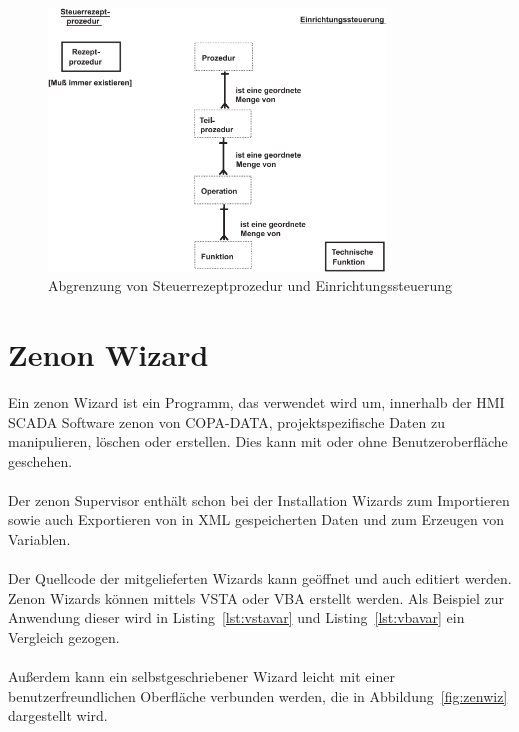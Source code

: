 \begin{figure}[h!]
		\centering
		\includegraphics[width=0.8\textwidth]{graphics/stateoftheart/steuerrezeptprozedur_einrichtungssteuerung.png}
		\caption{Abgrenzung von Steuerrezeptprozedur und Einrichtungssteuerung \cite{en61512}}
\end{figure}


\section{Zenon Wizard}
Ein zenon Wizard ist ein Programm, das verwendet wird um, innerhalb der HMI SCADA Software zenon von COPA-DATA, projektspezifische Daten zu manipulieren, löschen oder erstellen. Dies kann mit oder ohne Benutzeroberfläche geschehen.\\\\
Der zenon Supervisor enthält schon bei der Installation Wizards zum Importieren sowie auch Exportieren von in \ac{XML} gespeicherten Daten und zum Erzeugen von Variablen.\cite{zenprog}\\\\
Der Quellcode der mitgelieferten Wizards kann geöffnet und auch editiert werden.\\
Zenon Wizards können mittels \ac{VSTA} oder \ac{VBA} erstellt werden. Als Beispiel zur Anwendung dieser wird in Listing~\ref{lst:vstavar} und Listing~\ref{lst:vbavar} ein Vergleich gezogen.\\\\
Außerdem kann ein selbstgeschriebener Wizard leicht mit einer benutzerfreundlichen Oberfläche verbunden werden, die in Abbildung~\ref{fig:zenwiz} dargestellt wird.

